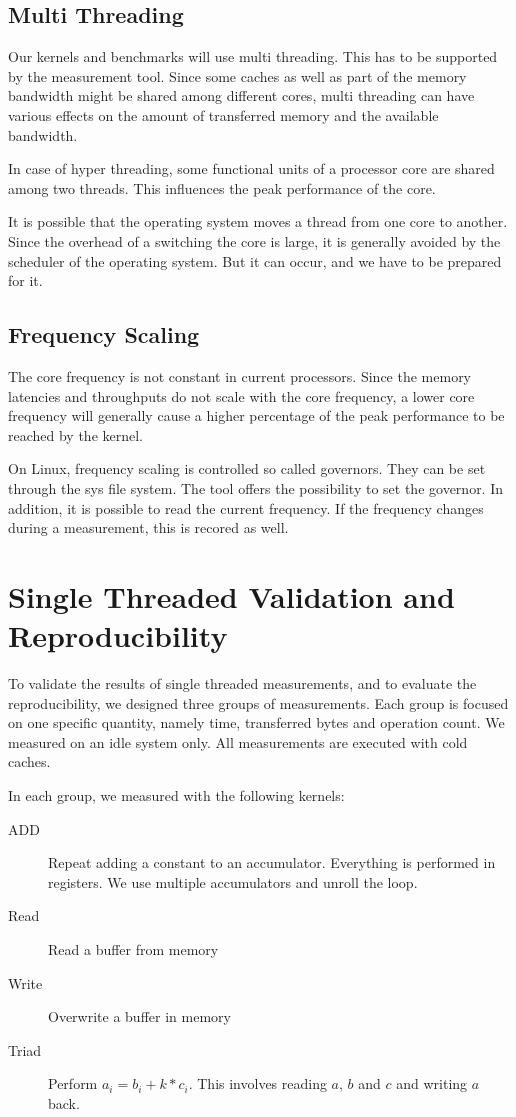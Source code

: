 \documentclass[a4paper,12pt]{article}
\begin{document}
\subsection{Multi Threading}
Our kernels and benchmarks will use multi threading. This has to be supported by
the measurement tool. Since some caches as well as part of the memory bandwidth
might be shared among different cores, multi threading can have various effects
on the amount of transferred memory and the available bandwidth.

In case of hyper threading, some functional units of a processor core are shared
among two threads. This influences the peak performance of the core.

It is possible that the operating system moves a thread from one core to
another. Since the overhead of a switching the core is large, it is generally
avoided by the scheduler of the operating system. But it can occur, and we have
to be prepared for it.

\subsection{Frequency Scaling}
The core frequency is not constant in current processors. Since the memory
latencies and throughputs do not scale with the core frequency, a lower core
frequency will generally cause a higher percentage of the peak performance to be
reached by the kernel.

On Linux, frequency scaling is controlled so called governors. They can be set
through the sys file system. The tool offers the possibility to set the
governor. In addition, it is possible to read the current frequency. If the
frequency changes during a measurement, this is recored as well.

\section{Single Threaded Validation and Reproducibility}
To validate the results of single threaded measurements, and to evaluate the
reproducibility, we designed three groups of measurements. Each group is focused
on one specific quantity, namely time, transferred bytes and operation count. We
measured on an idle system only. All measurements are executed with cold caches.

In each group, we measured with the following kernels:
\begin{description}
\item[ADD] Repeat adding a constant to an accumulator. Everything is performed
in registers. We use multiple accumulators and unroll the loop. 
\item[Read] Read a buffer from memory
\item[Write] Overwrite a buffer in memory
\item[Triad] Perform $a_i=b_i+k*c_i$. This involves reading $a$, $b$ and $c$ and
writing $a$ back.
\end{description}
\end{document}
